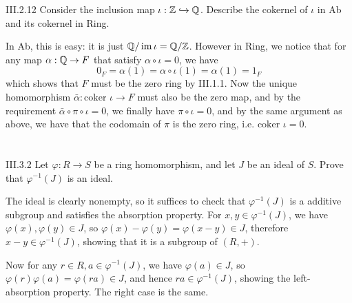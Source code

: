 \begin{problem}{III.2.12}
Consider the inclusion map $\iota : \mathbb{Z} \xhookrightarrow{} \mathbb{Q}$. Describe the cokernel of $\iota$ in \textsf{Ab} and its cokernel in \textsf{Ring}.
\end{problem}
\begin{sol}
In \textsf{Ab}, this is easy: it is just $\mathbb{Q}/\operatorname{im} \iota = \mathbb{Q} / \mathbb{Z}$. However in \textsf{Ring}, we notice that for any map $\alpha : \mathbb{Q} \to F$ that satisfy $\alpha \circ \iota = 0$, we have
\[
0_F = \alpha (1) = \alpha \circ \iota (1) = \alpha (1) = 1_F  
\] 
which shows that $F$ must be the zero ring by III.1.1. Now the unique homomorphism $\bar{\alpha} :\text{coker } \iota \to F$ must also be the zero map, and by the requirement $\bar{\alpha} \circ \pi \circ \iota = 0$, we finally have $\pi \circ \iota = 0$, and by the same argument as above, we have that the codomain of $\pi$ is the zero ring, i.e. $\text{coker } \iota = 0$.
\end{sol}

\section{}

\begin{problem}{III.3.2}
Let $\varphi:R \to S$ be a ring homomorphism, and let $J$ be an ideal of $S$. Prove that $\varphi^{-1}(J)$ is an ideal.
\end{problem}
\begin{pf}
The ideal is clearly nonempty, so it suffices to check that $\varphi^{-1}(J)$ is a additive subgroup and satisfies the absorption property. For $x, y \in \varphi^{-1}(J)$, we have $\varphi(x), \varphi(y) \in J$, so $\varphi(x)-\varphi(y) = \varphi(x-y) \in J$, therefore $x-y \in \varphi^{-1}(J)$, showing that it is a subgroup of $(R,+)$.

Now for any $r \in R, a \in \varphi^{-1}(J)$, we have $\varphi(a) \in J$, so $\varphi(r)\varphi(a) = \varphi(ra) \in J$, and hence $ra \in \varphi^{-1}(J)$, showing the left-absorption property. The right case is the same.
\end{pf}

